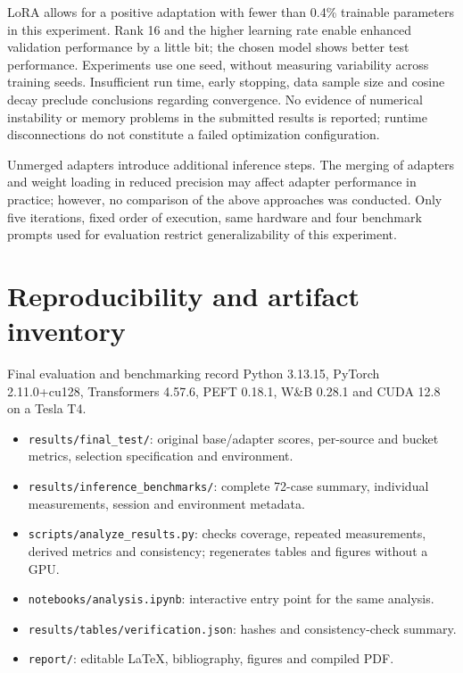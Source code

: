 \documentclass[10pt,a4paper,twocolumn]{article}
\begin{document}
LoRA allows for a positive adaptation with fewer than 0.4\% trainable parameters in this experiment. Rank 16 and the higher learning rate enable enhanced validation performance by a little bit; the chosen model shows better test performance. Experiments use one seed, without measuring variability across training seeds. Insufficient run time, early stopping, data sample size and cosine decay preclude conclusions regarding convergence. No evidence of numerical instability or memory problems in the submitted results is reported; runtime disconnections do not constitute a failed optimization configuration.

Unmerged adapters introduce additional inference steps. The merging of adapters and weight loading in reduced precision may affect adapter performance in practice; however, no comparison of the above approaches was conducted. Only five iterations, fixed order of execution, same hardware and four benchmark prompts used for evaluation restrict generalizability of this experiment.

\section{Reproducibility and artifact inventory}

Final evaluation and benchmarking record Python 3.13.15, PyTorch 2.11.0+cu128, Transformers 4.57.6, PEFT 0.18.1, W\&B 0.28.1 and CUDA 12.8 on a Tesla T4.

\begin{itemize}
    \setlength{\itemsep}{1pt}
    \setlength{\parskip}{0pt}
    \item \texttt{results/final\_test/}: original base/adapter scores, per-source and bucket metrics, selection specification and environment.
    
    \item \texttt{results/inference\_benchmarks/}: complete 72-case summary, individual measurements, session and environment metadata.
    
    \item \texttt{scripts/analyze\_results.py}: checks coverage, repeated measurements, derived metrics and consistency; regenerates tables and figures without a GPU.
    
    \item \texttt{notebooks/analysis.ipynb}: interactive entry point for the same analysis.
    
    \item \texttt{results/tables/verification.json}: hashes and consistency-check summary.
    
    \item \texttt{report/}: editable LaTeX, bibliography, figures and compiled PDF.
\end{itemize}
\end{document}
